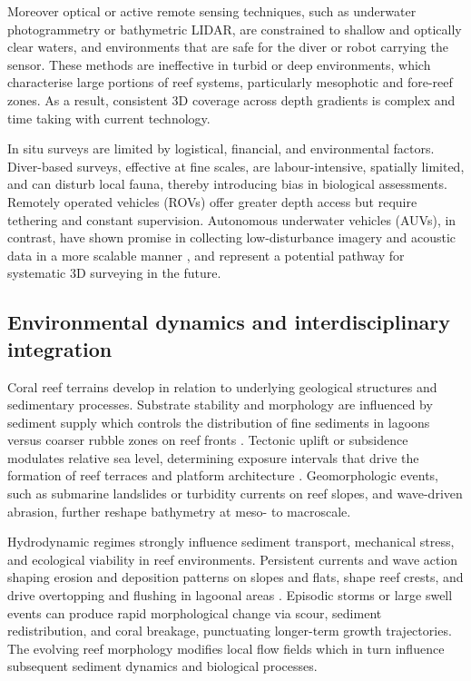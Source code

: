 Moreover optical or active remote sensing techniques, such as underwater photogrammetry or bathymetric LIDAR, are constrained to shallow and optically clear waters, and environments that are safe for the diver or robot carrying the sensor. These methods are ineffective in turbid or deep environments, which characterise large portions of reef systems, particularly mesophotic and fore-reef zones. As a result, consistent 3D coverage across depth gradients is complex and time taking with current technology.

In situ surveys are limited by logistical, financial, and environmental factors. Diver-based surveys, effective at fine scales, are labour-intensive, spatially limited, and can disturb local fauna, thereby introducing bias in biological assessments. Remotely operated vehicles (ROVs) offer greater depth access but require tethering and constant supervision. Autonomous underwater vehicles (AUVs), in contrast, have shown promise in collecting low-disturbance imagery and acoustic data in a more scalable manner \cite{GonzalezRivero2016,Modasshir2018}, and represent a potential pathway for systematic 3D surveying in the future.


\subsection{Environmental dynamics and interdisciplinary integration}
Coral reef terrains develop in relation to underlying geological structures and sedimentary processes. Substrate stability and morphology are influenced by sediment supply which controls the distribution of fine sediments in lagoons versus coarser rubble zones on reef fronts \cite{Montaggioni2005}. Tectonic uplift or subsidence modulates relative sea level, determining exposure intervals that drive the formation of reef terraces and platform architecture \cite{Hopley2014}. Geomorphologic events, such as submarine landslides or turbidity currents on reef slopes, and wave-driven abrasion, further reshape bathymetry at meso- to macroscale.

Hydrodynamic regimes strongly influence sediment transport, mechanical stress, and ecological viability in reef environments. Persistent currents and wave action shaping erosion and deposition patterns on slopes and flats, shape reef crests, and drive overtopping and flushing in lagoonal areas \cite{Lowe2009}. Episodic storms or large swell events can produce rapid morphological change via scour, sediment redistribution, and coral breakage, punctuating longer-term growth trajectories. The evolving reef morphology modifies local flow fields which in turn influence subsequent sediment dynamics and biological processes.

